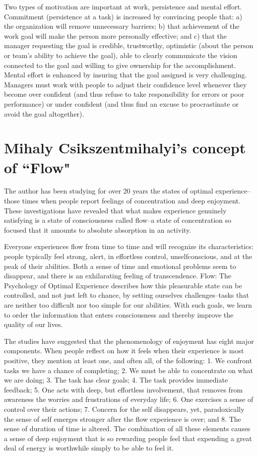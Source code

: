 Two types of motivation are important at work, persistence and mental effort. Commitment (persistence at a task) is increased by convincing people that: a) the organization will remove unnecessary barriers; b) that achievement of the work goal will make the person more personally effective; and c) that the manager requesting the goal is credible, trustworthy, optimistic (about the person or team’s ability to achieve the goal), able to clearly communicate the vision connected to the goal and willing to give ownership for the accomplishment. Mental effort is enhanced by insuring that the goal assigned is very challenging. Managers must work with people to adjust their confidence level whenever they become over confident (and thus refuse to take responsibility for errors or poor performance) or under confident (and thus find an excuse to procrastinate or avoid the goal altogether).


\section{Mihaly Csikszentmihalyi's concept of ``Flow"}
\label{sec:flow}

The author has been studying for over 20 years the states of optimal experience--those times when people report feelings of concentration and deep enjoyment. These investigations have revealed that what makes experience genuinely satisfying is a state of consciousness called flow--a state of concentration so focused that it amounts to absolute absorption in an activity. 

Everyone experiences flow from time to time and will recognize its characteristics: people typically feel strong, alert, in effortless control, unselfconscious, and at the peak of their abilities. Both a sense of time and emotional problems seem to disappear, and there is an exhilarating feeling of transcendence. Flow: The Psychology of Optimal Experience describes how this pleasurable state can be controlled, and not just left to chance, by setting ourselves challenges--tasks that are neither too difficult nor too simple for our abilities. With such goals, we learn to order the information that enters consciousness and thereby improve the quality of our lives.

The studies have suggested that the phenomenology of enjoyment has eight major components. When people reflect on how it feels when their experience is most positive, they mention at least one, and often all, of the following:
1. We confront tasks we have a chance of completing;
2. We must be able to concentrate on what we are doing; 3. The task has clear goals;
4. The task provides immediate feedback;
5. One acts with deep, but effortless involvement, that removes from awareness the worries and frustrations
of everyday life;
6. One exercises a sense of control over their actions;
7. Concern for the self disappears, yet, paradoxically
the sense of self emerges stronger after the flow experience is over; and
8. The sense of duration of time is altered.
The combination of all these elements causes a sense of deep enjoyment that is so rewarding people feel that expending a great deal of energy is worthwhile simply to be able to feel it.

